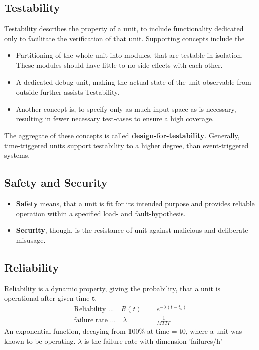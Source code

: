 	\subsection{Testability}
	{Testability} describes the property of a unit, to include functionality dedicated only to facilitate the verification of that unit. Supporting concepts include the \\
	\begin{itemize}
		\item Partitioning of the whole unit into modules, that are testable in isolation. These modules should have little to no side-effects with each other. 
		\item A dedicated debug-unit, making the actual state of the unit observable from outside further assists Testability. 
		\item Another concept is, to specify only as much input space as is necessary, resulting in fewer necessary test-cases to ensure a high coverage.
	\end{itemize}

	The aggregate of these concepts is called {\bf design-for-testability}.
	Generally, time-triggered units support testability to a higher degree, than event-triggered systems.
	\subsection{Safety and Security}
	\begin{itemize}
		\item {\bf Safety} means, that a unit is fit for its intended purpose and provides reliable operation within a specified load- and fault-hypothesis.
		\item {\bf Security}, though, is the resistance of unit against malicious and deliberate misusage.
	\end{itemize}
	\subsection{Reliability}
	{Reliability} is a dynamic property, giving the probability, that a unit is operational after given time {\bf t}.
		\begin{align*}
		\textrm{Reliability ...} \quad R(t) & = e^{-\lambda (t-t_o) }\\
		\textrm{failure rate ...}  \quad \lambda & = \frac{1}{MTTF} 
		\end{align*}
	An exponential function, decaying from 100\% at time = t0, where a unit was known to be operating. $\lambda$ is the failure rate with dimension 'failures/h'
	
